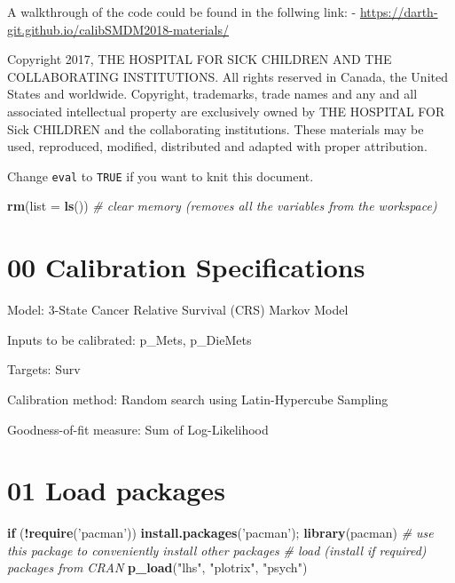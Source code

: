 \documentclass[
]{article}
\newenvironment{Shaded}{\begin{snugshade}}{\end{snugshade}}
\newcommand{\CommentTok}[1]{\textcolor[rgb]{0.56,0.35,0.01}{\textit{#1}}}
\newcommand{\ControlFlowTok}[1]{\textcolor[rgb]{0.13,0.29,0.53}{\textbf{#1}}}
\newcommand{\DataTypeTok}[1]{\textcolor[rgb]{0.13,0.29,0.53}{#1}}
\newcommand{\KeywordTok}[1]{\textcolor[rgb]{0.13,0.29,0.53}{\textbf{#1}}}
\newcommand{\NormalTok}[1]{#1}
\newcommand{\OperatorTok}[1]{\textcolor[rgb]{0.81,0.36,0.00}{\textbf{#1}}}
\newcommand{\StringTok}[1]{\textcolor[rgb]{0.31,0.60,0.02}{#1}}
\begin{document}
A walkthrough of the code could be found in the follwing link: -
\url{https://darth-git.github.io/calibSMDM2018-materials/}

Copyright 2017, THE HOSPITAL FOR SICK CHILDREN AND THE COLLABORATING
INSTITUTIONS. All rights reserved in Canada, the United States and
worldwide. Copyright, trademarks, trade names and any and all associated
intellectual property are exclusively owned by THE HOSPITAL FOR Sick
CHILDREN and the collaborating institutions. These materials may be
used, reproduced, modified, distributed and adapted with proper
attribution.

\newpage

Change \texttt{eval} to \texttt{TRUE} if you want to knit this document.

\begin{Shaded}
\begin{Highlighting}[]
\KeywordTok{rm}\NormalTok{(}\DataTypeTok{list =} \KeywordTok{ls}\NormalTok{())      }\CommentTok{# clear memory (removes all the variables from the workspace)}
\end{Highlighting}
\end{Shaded}

\hypertarget{calibration-specifications}{%
\section{00 Calibration
Specifications}\label{calibration-specifications}}

Model: 3-State Cancer Relative Survival (CRS) Markov Model

Inputs to be calibrated: p\_Mets, p\_DieMets

Targets: Surv

Calibration method: Random search using Latin-Hypercube Sampling

Goodness-of-fit measure: Sum of Log-Likelihood

\hypertarget{load-packages}{%
\section{01 Load packages}\label{load-packages}}

\begin{Shaded}
\begin{Highlighting}[]
\ControlFlowTok{if}\NormalTok{ (}\OperatorTok{!}\KeywordTok{require}\NormalTok{(}\StringTok{'pacman'}\NormalTok{)) }\KeywordTok{install.packages}\NormalTok{(}\StringTok{'pacman'}\NormalTok{); }\KeywordTok{library}\NormalTok{(pacman) }\CommentTok{# use this package to conveniently install other packages}
\CommentTok{# load (install if required) packages from CRAN}
\KeywordTok{p_load}\NormalTok{(}\StringTok{"lhs"}\NormalTok{, }\StringTok{"plotrix"}\NormalTok{, }\StringTok{"psych"}\NormalTok{)}
\end{Highlighting}
\end{Shaded}
\end{document}
